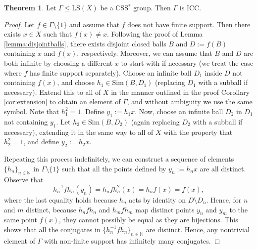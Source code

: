 \documentclass[12pt]{amsart}
\numberwithin{equation}{subsection}
\theoremstyle{definition}
\newtheorem{theorem}{Theorem}[section]
\theoremstyle{definition}
\theoremstyle{remark}
\begin{document}
\begin{theorem}\label{thm:icc}
Let $\Gamma \leq \text{LS}(X)$ be a CSS$^*$ group. Then $\Gamma$ is ICC.
\end{theorem}
\begin{proof}



Let $f \in \Gamma \setminus \{1\}$ and assume that $f$ does not have finite support. Then there exists $x \in X$ such that $f(x) \neq x$. Following the proof of Lemma \ref{lemma:disjointballs}, there exists disjoint closed balls $B$ and $D:= f(B)$ containing $x$ and $f(x)$, respectively. Moreover, we can assume that $B$ and $D$ are both infinite by choosing a different $x$ to start with if necessary (we treat the case where $f$ has finite support separately). Choose an infinite ball $D_1$ inside $D$ not containing $f(x)$, and choose $h_1 \in \text{Sim}(B,D_1)$ (replacing $D_1$ with a subball if necessary). Extend this to all of $X$ in the manner outlined in the proof Corollary \ref{cor:extension} to obtain an element of $\Gamma$, and without ambiguity we use the same symbol. Note that $h_1^2 = 1$. Define $y_1 := h_1x$. Now, choose an infinite ball $D_2$ in $D_1$ not containing $y_1$. Let $h_2 \in \text{Sim}(B,D_2)$ (again replacing $D_2$ with a subball if necessary), extending it in the same way to all of $X$ with the property that $h_2^2 = 1$, and define $y_2 := h_2x$. 

Repeating this process indefinitely, we can construct a sequence  of elements $\{h_n\}_{n \in \mathbb{N}}$ in $\Gamma \setminus \{1\}$ such that all the points defined by $y_n := h_nx$ are all distinct. Observe that $$h_n^{-1} f h_n(y_n) = h_nfh_n^2(x) = h_n f(x) = f(x),$$ where the last equality holds because $h_n$ acts by identity on $D \setminus D_n$. Hence, for $n$ and $m$ distinct, because $h_n f h_n$ and $h_m f h_m$ map distinct points $y_n$ and $y_m$ to the same point $f(x)$, they cannot possibly be equal as they are bijections. This shows that all the conjugates in $\{h_n^{-1} f h_n\}_{n \in \mathbb{N}}$ are distinct. Hence, any nontrivial element of $\Gamma$ with non-finite support has infinitely many conjugates.


\end{proof}
\end{document}
